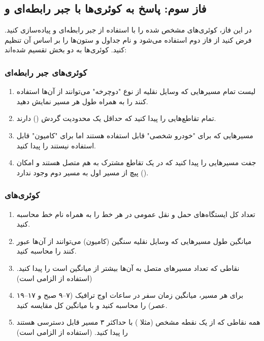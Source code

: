 \documentclass[12pt,a4paper]{article}
\begin{document}
\subsection{فاز سوم: پاسخ به کوئری‌ها با جبر رابطه‌ای و }
در این فاز، کوئری‌های مشخص شده را با استفاده از جبر رابطه‌ای و  پیاده‌سازی کنید. فرض کنید از  فاز دوم استفاده می‌شود و نام جداول و ستون‌ها را بر اساس آن تنظیم کنید. کوئری‌ها به دو بخش تقسیم شده‌اند:

\subsubsection{کوئری‌های جبر رابطه‌ای}
\begin{enumerate}
\item لیست تمام مسیرهایی که وسایل نقلیه از نوع "دوچرخه" می‌توانند از آن‌ها استفاده کنند را به همراه طول هر مسیر نمایش دهید.
\item تمام تقاطع‌هایی را پیدا کنید که حداقل یک محدودیت گردش () دارند.
\item مسیرهایی که برای "خودرو شخصی" قابل استفاده هستند اما برای "کامیون" قابل استفاده نیستند را پیدا کنید.
\item جفت مسیرهایی را پیدا کنید که در یک تقاطع مشترک به هم متصل هستند و امکان پیچ از مسیر اول به مسیر دوم وجود ندارد ().
\end{enumerate}

\subsubsection{کوئری‌های }
\begin{enumerate}
\item تعداد کل ایستگاه‌های حمل و نقل عمومی در هر خط را به همراه نام خط محاسبه کنید.
\item میانگین طول مسیرهایی که وسایل نقلیه سنگین (کامیون) می‌توانند از آن‌ها عبور کنند را محاسبه کنید.
\item نقاطی که تعداد مسیرهای متصل به آن‌ها بیشتر از میانگین است را پیدا کنید. (استفاده از  الزامی است)
\item برای هر مسیر، میانگین زمان سفر در ساعات اوج ترافیک (۷--۹ صبح و ۱۷--۱۹ عصر) را محاسبه کنید و با میانگین کل مقایسه کنید.
\item همه نقاطی که از یک نقطه مشخص (مثلا ) با حداکثر ۳ مسیر قابل دسترسی هستند را پیدا کنید. (استفاده از  الزامی است)
\end{enumerate}
\end{document}
